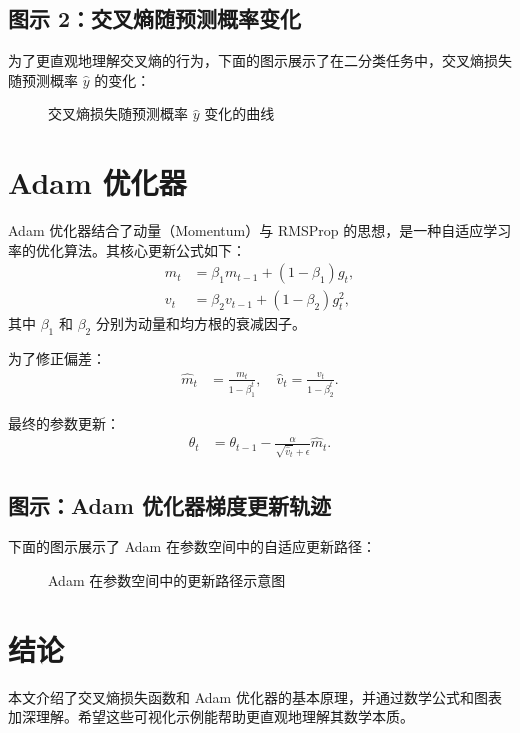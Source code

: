 \documentclass[11pt]{ctexart} %
\begin{document}
\subsection{图示 2：交叉熵随预测概率变化}
为了更直观地理解交叉熵的行为，下面的图示展示了在二分类任务中，交叉熵损失随预测概率 \(\hat{y}\) 的变化：
\begin{figure}[h]
\centering
{}
\caption{交叉熵损失随预测概率 $\hat{y}$ 变化的曲线}
\end{figure}

\section{Adam 优化器}
Adam 优化器结合了动量（Momentum）与 RMSProp 的思想，是一种自适应学习率的优化算法。其核心更新公式如下：
\begin{align}
m_t &= \beta_1 m_{t-1} + (1-\beta_1) g_t, \\
v_t &= \beta_2 v_{t-1} + (1-\beta_2) g_t^2,
\end{align}
其中 \(\beta_1\) 和 \(\beta_2\) 分别为动量和均方根的衰减因子。

为了修正偏差：
\begin{align}
\hat{m}_t &= \frac{m_t}{1-\beta_1^t}, \quad \hat{v}_t = \frac{v_t}{1-\beta_2^t}.
\end{align}

最终的参数更新：
\begin{align}
\theta_t &= \theta_{t-1} - \frac{\alpha}{\sqrt{\hat{v}_t}+\epsilon}\hat{m}_t.
\end{align}

\subsection{图示：Adam 优化器梯度更新轨迹}
下面的图示展示了 Adam 在参数空间中的自适应更新路径：
\begin{figure}[h]
\centering
{}
\caption{Adam 在参数空间中的更新路径示意图}
\end{figure}

\section{结论}
本文介绍了交叉熵损失函数和 Adam 优化器的基本原理，并通过数学公式和图表加深理解。希望这些可视化示例能帮助更直观地理解其数学本质。



\end{document}
